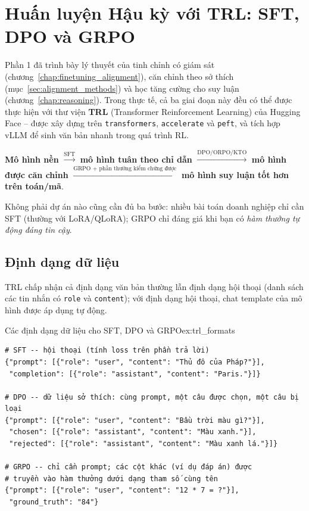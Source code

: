 
\section{Huấn luyện Hậu kỳ với TRL: SFT, DPO và GRPO \newtag}
\label{sec:posttraining_trl}

Phần 1 đã trình bày lý thuyết của tinh chỉnh có giám sát (chương~\ref{chap:finetuning_alignment}), căn chỉnh theo sở thích (mục~\ref{sec:alignment_methods}) và học tăng cường cho suy luận (chương~\ref{chap:reasoning}). Trong thực tế, cả ba giai đoạn này đều có thể được thực hiện với thư viện \textbf{TRL} (Transformer Reinforcement Learning) của Hugging Face -- được xây dựng trên \texttt{transformers}, \texttt{accelerate} và \texttt{peft}, và tích hợp vLLM để sinh văn bản nhanh trong quá trình RL.

\begin{tcolorbox}[title={Quy trình hậu huấn luyện điển hình}, colback=blue!5!white, colframe=blue!60!black, fonttitle=\bfseries]
\textbf{Mô hình nền} $\xrightarrow{\text{SFT}}$ \textbf{mô hình tuân theo chỉ dẫn} $\xrightarrow{\text{DPO/ORPO/KTO}}$ \textbf{mô hình được căn chỉnh} $\xrightarrow{\text{GRPO + phần thưởng kiểm chứng được}}$ \textbf{mô hình suy luận tốt hơn trên toán/mã}.

Không phải dự án nào cũng cần đủ ba bước: nhiều bài toán doanh nghiệp chỉ cần SFT (thường với LoRA/QLoRA); GRPO chỉ đáng giá khi bạn có \emph{hàm thưởng tự động đáng tin cậy}.
\end{tcolorbox}

\subsection{Định dạng dữ liệu}
\label{ssec:trl_data_formats}
TRL chấp nhận cả định dạng văn bản thường lẫn định dạng hội thoại (danh sách các tin nhắn có \texttt{role} và \texttt{content}); với định dạng hội thoại, chat template của mô hình được áp dụng tự động.

\begin{example}{Các định dạng dữ liệu cho SFT, DPO và GRPO}{ex:trl_formats}
\begin{verbatim}
# SFT -- hội thoại (tính loss trên phần trả lời)
{"prompt": [{"role": "user", "content": "Thủ đô của Pháp?"}],
 "completion": [{"role": "assistant", "content": "Paris."}]}

# DPO -- dữ liệu sở thích: cùng prompt, một câu được chọn, một câu bị loại
{"prompt": [{"role": "user", "content": "Bầu trời màu gì?"}],
 "chosen": [{"role": "assistant", "content": "Màu xanh."}],
 "rejected": [{"role": "assistant", "content": "Màu xanh lá."}]}

# GRPO -- chỉ cần prompt; các cột khác (ví dụ đáp án) được
# truyền vào hàm thưởng dưới dạng tham số cùng tên
{"prompt": [{"role": "user", "content": "12 * 7 = ?"}],
 "ground_truth": "84"}
\end{verbatim}
\end{example}

